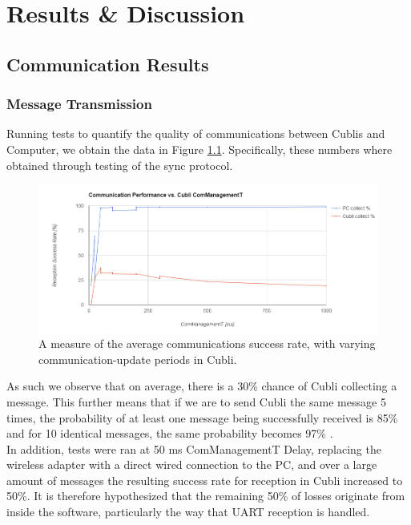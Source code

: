 \chapter{Results \& Discussion}\label{sec:results}

\section{Communication Results}

\subsection{Message Transmission}

Running tests to quantify the quality of communications between Cublis and Computer, we obtain the data in Figure \ref{img:comStats}. Specifically, these numbers where obtained through testing of the sync protocol.

\begin{figure}[H]
   \centering
   \includegraphics[width=1\textwidth]{img/comStats.png}
   \caption{A measure of the average communications success rate, with varying communication-update periods in Cubli.}
   \label{img:comStats}
\end{figure}

As such we observe that on average, there is a 30\% chance of Cubli collecting a message. This further means that if we are to send Cubli the same message 5 times, the probability of at least one message being successfully received is 85\% and for 10 identical messages, the same probability becomes 97\% .\\

In addition, tests were ran at 50 ms ComManagementT Delay, replacing the wireless adapter with a direct wired connection to the PC, and over a large amount of messages the resulting success rate for reception in Cubli increased to 50\%. It is therefore hypothesized that the remaining 50\% of losses originate from inside the software, particularly the way that UART reception is handled.\\

